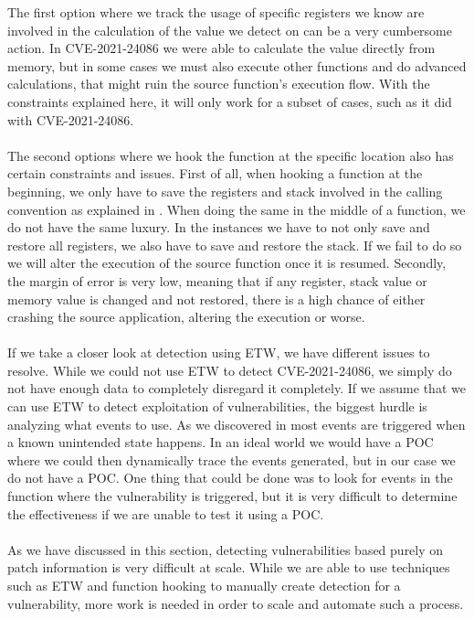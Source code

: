 \documentclass{report}
\begin{document}
The first option where we track the usage of specific registers we know are involved in the calculation of the value we detect on can be a very cumbersome action. In CVE-2021-24086 we were able to calculate the value directly from memory, but in some cases we must also execute other functions and do advanced calculations, that might ruin the source function's execution flow. With the constraints explained here, it will only work for a subset of cases, such as it did with CVE-2021-24086.
\\
\\
The second options where we hook the function at the specific location also has certain constraints and issues. First of all, when hooking a function at the beginning, we only have to save the registers and stack involved in the calling convention as explained in . When doing the same in the middle of a function, we do not have the same luxury. In the instances we have to not only save and restore all registers, we also have to save and restore the stack. If we fail to do so we will alter the execution of the source function once it is resumed. Secondly, the margin of error is very low, meaning that if any register, stack value or memory value is changed and not restored, there is a high chance of either crashing the source application, altering the execution or worse.
\\
\\
If we take a closer look at detection using \gls{ETW}, we have different issues to resolve. While we could not use \gls{ETW} to detect CVE-2021-24086, we simply do not have enough data to completely disregard it completely. If we assume that we can use \gls{ETW} to detect exploitation of vulnerabilities, the biggest hurdle is analyzing what events to use. As we discovered in  most events are triggered when a known unintended state happens. In an ideal world we would have a \gls{POC} where we could then dynamically trace the events generated, but in our case we do not have a \gls{POC}. One thing that could be done was to look for events in the function where the vulnerability is triggered, but it is very difficult to determine the effectiveness if we are unable to test it using a \gls{POC}.
\\
\\
As we have discussed in this section, detecting vulnerabilities based purely on patch information is very difficult at scale. While we are able to use techniques such as \gls{ETW} and function hooking to manually create detection for a vulnerability, more work is needed in order to scale and automate such a process.
\end{document}
